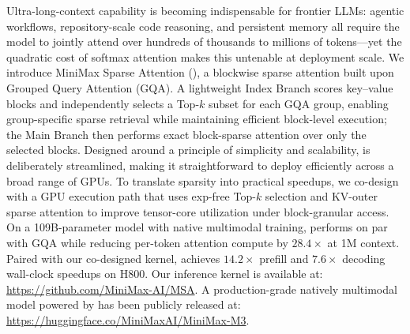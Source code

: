 Ultra-long-context capability is becoming indispensable for frontier LLMs: agentic workflows, repository-scale code reasoning, and persistent memory all require the model to jointly attend over hundreds of thousands to millions of tokens—yet the quadratic cost of softmax attention makes this untenable at deployment scale. We introduce MiniMax Sparse Attention (\method{}), a blockwise sparse attention built upon Grouped Query Attention (GQA).
A lightweight Index Branch scores key–value blocks and independently selects a Top-$k$ subset for each GQA group, enabling group-specific sparse retrieval while maintaining efficient block-level execution; the Main Branch then performs exact block-sparse attention over only the selected blocks. Designed around a principle of simplicity and scalability, \method{} is deliberately streamlined, making it straightforward to deploy efficiently across a broad range of GPUs.
To translate sparsity into practical speedups, we co-design \method{} with a GPU execution path that uses exp-free Top-$k$ selection and KV-outer sparse attention to improve tensor-core utilization under block-granular access. On a 109B-parameter model with native multimodal training, \method{} performs on par with GQA while reducing per-token attention compute by $28.4\times$ at 1M context. Paired with our co-designed kernel, \method{} achieves $14.2\times$ prefill and $7.6\times$ decoding wall-clock speedups on H800. Our inference kernel is available at: \url{https://github.com/MiniMax-AI/MSA}. A production-grade natively multimodal model powered by \method{} has been publicly released at: \url{https://huggingface.co/MiniMaxAI/MiniMax-M3}.  

